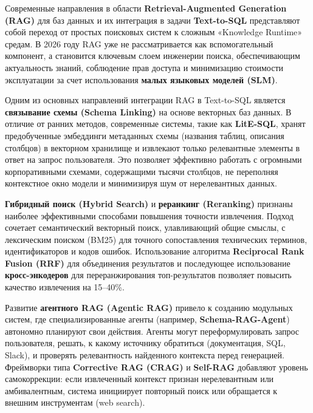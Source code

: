 Современные направления в области \textbf{Retrieval-Augmented Generation (RAG)} для баз данных и их интеграция в задачи \textbf{Text-to-SQL} представляют собой переход от простых поисковых систем к сложным «Knowledge Runtime» средам. \cite{piao2025litesql} В 2026 году RAG уже не рассматривается как вспомогательный компонент, а становится ключевым слоем инженерии поиска, обеспечивающим актуальность знаний, соблюдение прав доступа и минимизацию стоимости эксплуатации за счет использования \textbf{малых языковых моделей (SLM)}. \cite{kmoseenk2026return}

Одним из основных направлений интеграции RAG в Text-to-SQL является \textbf{связывание схемы (Schema Linking)} на основе векторных баз данных. \cite{piao2025litesql} В отличие от ранних методов, современные системы, такие как \textbf{LitE-SQL}, хранят предобученные эмбеддинги метаданных схемы (названия таблиц, описания столбцов) в векторном хранилище и извлекают только релевантные элементы в ответ на запрос пользователя. \cite{piao2025litesql, piao2025arxiv} Это позволяет эффективно работать с огромными корпоративными схемами, содержащими тысячи столбцов, не переполняя контекстное окно модели и минимизируя шум от нерелевантных данных. \cite{ji2026benchmarks, piao2025litesql}

\textbf{Гибридный поиск (Hybrid Search)} и \textbf{реранкинг (Reranking)} признаны наиболее эффективными способами повышения точности извлечения. \cite{akzhankalimatov2026rag, kmoseenk2026return} Подход сочетает семантический векторный поиск, улавливающий общие смыслы, с лексическим поиском (BM25) для точного сопоставления технических терминов, идентификаторов и кодов ошибок. \cite{lin2025higress} Использование алгоритма \textbf{Reciprocal Rank Fusion (RRF)} для объединения результатов и последующее использование \textbf{кросс-энкодеров} для переранжирования топ-результатов позволяет повысить качество извлечения на 15–40\%. \cite{lin2025higress}

Развитие \textbf{агентного RAG (Agentic RAG)} привело к созданию модульных систем, где специализированные агенты (например, \textbf{Schema-RAG-Agent}) автономно планируют свои действия. \cite{chudinov2025agentic, xie2025opensearch} Агенты могут переформулировать запрос пользователя, решать, к какому источнику обратиться (документация, SQL, Slack), и проверять релевантность найденного контекста перед генерацией. \cite{akzhankalimatov2026rag, xie2025opensearch} Фреймворки типа \textbf{Corrective RAG (CRAG)} и \textbf{Self-RAG} добавляют уровень самокоррекции: если извлеченный контекст признан нерелевантным или амбивалентным, система инициирует повторный поиск или обращается к внешним инструментам (web search). \cite{akzhankalimatov2026rag, lin2025higress}

